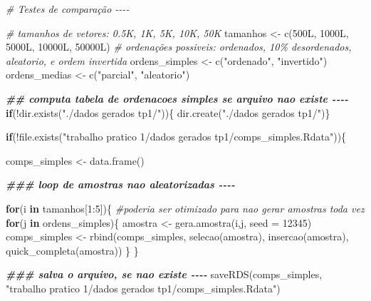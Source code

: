 \documentclass[
]{article}
\newenvironment{Shaded}{\begin{snugshade}}{\end{snugshade}}
\newcommand{\AttributeTok}[1]{\textcolor[rgb]{0.77,0.63,0.00}{#1}}
\newcommand{\CommentTok}[1]{\textcolor[rgb]{0.56,0.35,0.01}{\textit{#1}}}
\newcommand{\ControlFlowTok}[1]{\textcolor[rgb]{0.13,0.29,0.53}{\textbf{#1}}}
\newcommand{\DecValTok}[1]{\textcolor[rgb]{0.00,0.00,0.81}{#1}}
\newcommand{\DocumentationTok}[1]{\textcolor[rgb]{0.56,0.35,0.01}{\textbf{\textit{#1}}}}
\newcommand{\FunctionTok}[1]{\textcolor[rgb]{0.00,0.00,0.00}{#1}}
\newcommand{\NormalTok}[1]{#1}
\newcommand{\OtherTok}[1]{\textcolor[rgb]{0.56,0.35,0.01}{#1}}
\newcommand{\SpecialCharTok}[1]{\textcolor[rgb]{0.00,0.00,0.00}{#1}}
\newcommand{\StringTok}[1]{\textcolor[rgb]{0.31,0.60,0.02}{#1}}
\begin{document}
\begin{Shaded}
\begin{Highlighting}[]
\CommentTok{\# Testes de comparação {-}{-}{-}{-}}

\CommentTok{\# tamanhos de vetores: 0.5K, 1K, 5K, 10K, 50K}
\NormalTok{tamanhos }\OtherTok{\textless{}{-}} \FunctionTok{c}\NormalTok{(500L, 1000L, 5000L, 10000L, 50000L)}
\CommentTok{\# ordenações possiveis: ordenados, 10\% desordenados, aleatorio, e ordem invertida}
\NormalTok{ordens\_simples }\OtherTok{\textless{}{-}} \FunctionTok{c}\NormalTok{(}\StringTok{"ordenado"}\NormalTok{, }\StringTok{"invertido"}\NormalTok{)}
\NormalTok{ordens\_medias }\OtherTok{\textless{}{-}} \FunctionTok{c}\NormalTok{(}\StringTok{"parcial"}\NormalTok{, }\StringTok{"aleatorio"}\NormalTok{)}


\DocumentationTok{\#\# computa tabela de ordenacoes simples se arquivo nao existe {-}{-}{-}{-}}
\ControlFlowTok{if}\NormalTok{(}\SpecialCharTok{!}\FunctionTok{dir.exists}\NormalTok{(}\StringTok{"./dados gerados tp1/"}\NormalTok{))\{}
  \FunctionTok{dir.create}\NormalTok{(}\StringTok{"./dados gerados tp1/"}\NormalTok{)\}}

\ControlFlowTok{if}\NormalTok{(}\SpecialCharTok{!}\FunctionTok{file.exists}\NormalTok{(}\StringTok{"trabalho pratico 1/dados gerados tp1/comps\_simples.Rdata"}\NormalTok{))\{}

\NormalTok{  comps\_simples }\OtherTok{\textless{}{-}} \FunctionTok{data.frame}\NormalTok{()}
  
  \DocumentationTok{\#\#\# loop de amostras nao aleatorizadas {-}{-}{-}{-}}
    
  \ControlFlowTok{for}\NormalTok{(i }\ControlFlowTok{in}\NormalTok{ tamanhos[}\DecValTok{1}\SpecialCharTok{:}\DecValTok{5}\NormalTok{])\{ }\CommentTok{\#poderia ser otimizado para nao gerar amostras toda vez}
      \ControlFlowTok{for}\NormalTok{(j }\ControlFlowTok{in}\NormalTok{ ordens\_simples)\{}
\NormalTok{       amostra }\OtherTok{\textless{}{-}} \FunctionTok{gera.amostra}\NormalTok{(i,j, }\AttributeTok{seed =} \DecValTok{12345}\NormalTok{)}
\NormalTok{       comps\_simples }\OtherTok{\textless{}{-}} \FunctionTok{rbind}\NormalTok{(comps\_simples, }\FunctionTok{selecao}\NormalTok{(amostra), }
                              \FunctionTok{insercao}\NormalTok{(amostra), }\FunctionTok{quick\_completa}\NormalTok{(amostra))}
\NormalTok{    \}}
\NormalTok{  \}}

  
  \DocumentationTok{\#\#\# salva o arquivo, se nao existe {-}{-}{-}{-}}
  \FunctionTok{saveRDS}\NormalTok{(comps\_simples, }\StringTok{"trabalho pratico 1/dados gerados tp1/comps\_simples.Rdata"}\NormalTok{)}


\end{Highlighting}
\end{Shaded}
\end{document}
